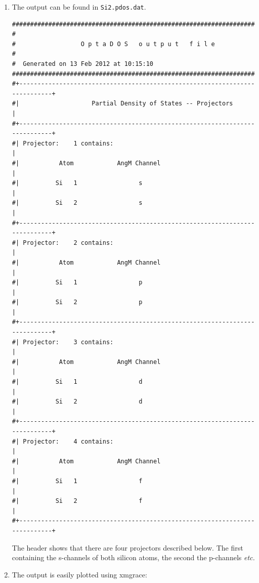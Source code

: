 \documentclass[a4paper,11pt,twoside]{book}
\begin{document}
{\begin{enumerate}
\item  The output can be found in {\tt Si2.pdos.dat}.
\begin{verbatim}
##############################################################################
#
#                  O p t a D O S   o u t p u t   f i l e
#
#  Generated on 13 Feb 2012 at 10:15:10
##############################################################################
#+----------------------------------------------------------------------------+
#|                    Partial Density of States -- Projectors                 |
#+----------------------------------------------------------------------------+
#| Projector:    1 contains:                                                  |
#|           Atom            AngM Channel                                     |
#|          Si   1                 s                                          |
#|          Si   2                 s                                          |
#+----------------------------------------------------------------------------+
#| Projector:    2 contains:                                                  |
#|           Atom            AngM Channel                                     |
#|          Si   1                 p                                          |
#|          Si   2                 p                                          |
#+----------------------------------------------------------------------------+
#| Projector:    3 contains:                                                  |
#|           Atom            AngM Channel                                     |
#|          Si   1                 d                                          |
#|          Si   2                 d                                          |
#+----------------------------------------------------------------------------+
#| Projector:    4 contains:                                                  |
#|           Atom            AngM Channel                                     |
#|          Si   1                 f                                          |
#|          Si   2                 f                                          |
#+----------------------------------------------------------------------------+
\end{verbatim}
The header shows that there are four projectors described below. The first containing the s-channels of both silicon atoms, the second the p-channels \emph{etc.}

\item The output is easily plotted using xmgrace:


\end{enumerate}}
\end{document}
